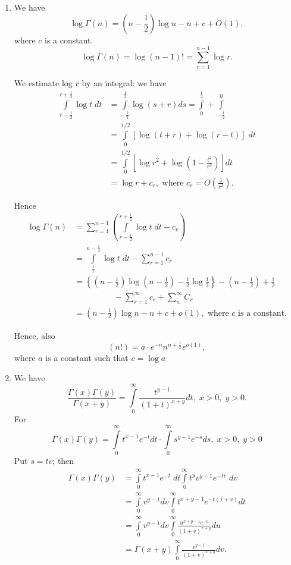 \begin{enumerate}
\item We have
$$
\log \Gamma (n) = \left(n - \frac{1}{2}\right) \log n - n + c + O (1),
$$
where $c$ is a constant.
$$
\log \Gamma (n) = \log (n -1) ! = \sum\limits^{n-1}_{r=1} \log r.
$$

We estimate log $r$ by an integral: we have
\begin{align*}
\int\limits^{r + \frac{1}{2}}_{r-\frac{1}{2}}  \log t \; dt  & =
\int\limits^{\frac{1}{2}}_{-\frac{1}{2}} \log (s+r) ds =
\int\limits^{\frac{1}{2}}_0 + \int\limits^0_{-\frac{1}{2}}\\
& = \int\limits^{1/2}_0 \left[\log (t+r) + \log (r-t) \right] \; dt\\
& = \int\limits^{1/2}_0 \left[ \log r^2 + \log \left(1-\frac{t^2}{r^2}
  \right)\right] dt\\
& = \log r + c_r, \text{ where } c_r = O \left(\frac{1}{r^2} \right).
\end{align*}

Hence
\begin{align*}
\log \Gamma (n) & = \sum\limits^{n-1}_{r=1}
\left(\int\limits^{r+\frac{1}{2}}_{r-\frac{1}{2}} \log t \; dt - c_r \right)\\
& = \int\limits^{n-\frac{1}{2}}_{\frac{1}{2}}  \log t \; dt -
\sum^{n-1}_{r=1} c_r\\
& = \left\{\left(n-\frac{1}{2} \right) \log \left(n-\frac{1}{2}
\right) - \frac{1}{2} \log \frac{1}{2}\right\} - \left(n-\frac{1}{2}\right) +
\frac{1}{2}\\
& \hspace{2cm} - \sum\limits^{\infty}_{r=1} c_r + \sum\limits^\infty_n
C_r\\
& = \left(n-\frac{1}{2}\right) \log n - n + c + o(1), \text{ where $c$ is a constant.}
\end{align*}\pageoriginale 

Hence, also 
$$
(n!) = a \cdot e^{-n} n^{n+\frac{1}{2}} e^{o(1)},
$$
where $a$ is a constant such that $c = \log a $

\item We have
$$
\frac{\Gamma (x) \Gamma (y)}{\Gamma (x+y)} = \int\limits^\infty_0
\frac{t^{y-1}}{(1+t)^{x+y}}  dt, \; x>0, \; y >0.
$$
For 
$$
\Gamma (x) \Gamma (y) = \int\limits^\infty_0 t^{x-1} e^{-t} dt \cdot
\int\limits^\infty_0 s^{y-1} e^{-s} ds, \; x >0,\; y >0
$$
Put $s = tv$; then
\begin{align*}
\Gamma (x) \Gamma (y) & = \int\limits^\infty_0 t^{x-1} e^{-t} \; dt
\int\limits^\infty_0 t^y v^{y-1} e^{-tv} \; dv\\
& = \int\limits^\infty_0 v^{y-1} dv \int\limits^\infty_0 t^{x+y-1}
e^{-t(1+v)} dt\\
& = \int\limits^\infty_0 v^{y-1} dv \int\limits^\infty_0
\frac{u^{x+y-1}e^{-u}}{(1+v)^{x+y}}  du\\
& = \Gamma (x+y) \int\limits^\infty_0 \frac{v^{y-1}}{(1+v)^{x+y}}dv.
\end{align*}


\end{enumerate}
